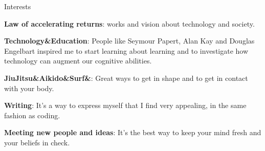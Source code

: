 \begin{rubric}{Interests}{
    \entry* \textbf{Law of accelerating returns}:  works and
    vision about technology and society. 

    \entry* \textbf{Technology\&Education}: People like 
    Seymour Papert, Alan Kay and Douglas Engelbart inspired me to
    start learning about learning and to investigate how technology can augment
    our cognitive abilities.

    \entry* \textbf{JiuJitsu\&Aikido\&Surf\&}: Great ways to get in shape and to get in
    contact with your body.

    \entry* \textbf{Writing}: It's a way to express myself that I find very
    appealing, in the same fashion as coding.

    \entry* \textbf{Meeting new people and ideas}: It's the best way to keep
    your mind fresh and your beliefs in check. 

}\end{rubric}

